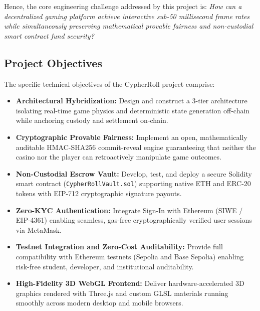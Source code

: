 Hence, the core engineering challenge addressed by this project is: \textit{How can a decentralized gaming platform achieve interactive sub-50 millisecond frame rates while simultaneously preserving mathematical provable fairness and non-custodial smart contract fund security?}

\subsection{Project Objectives}
The specific technical objectives of the CypherRoll project comprise:
\begin{itemize}[leftmargin=1.5em]
    \item \textbf{Architectural Hybridization:} Design and construct a 3-tier architecture isolating real-time game physics and deterministic state generation off-chain while anchoring custody and settlement on-chain.
    \item \textbf{Cryptographic Provable Fairness:} Implement an open, mathematically auditable HMAC-SHA256 commit-reveal engine guaranteeing that neither the casino nor the player can retroactively manipulate game outcomes.
    \item \textbf{Non-Custodial Escrow Vault:} Develop, test, and deploy a secure Solidity smart contract (\texttt{CypherRollVault.sol}) supporting native ETH and ERC-20 tokens with EIP-712 cryptographic signature payouts.
    \item \textbf{Zero-KYC Authentication:} Integrate Sign-In with Ethereum (SIWE / EIP-4361) enabling seamless, gas-free cryptographically verified user sessions via MetaMask.
    \item \textbf{Testnet Integration and Zero-Cost Auditability:} Provide full compatibility with Ethereum testnets (Sepolia and Base Sepolia) enabling risk-free student, developer, and institutional auditability.
    \item \textbf{High-Fidelity 3D WebGL Frontend:} Deliver hardware-accelerated 3D graphics rendered with Three.js and custom GLSL materials running smoothly across modern desktop and mobile browsers.
\end{itemize}
